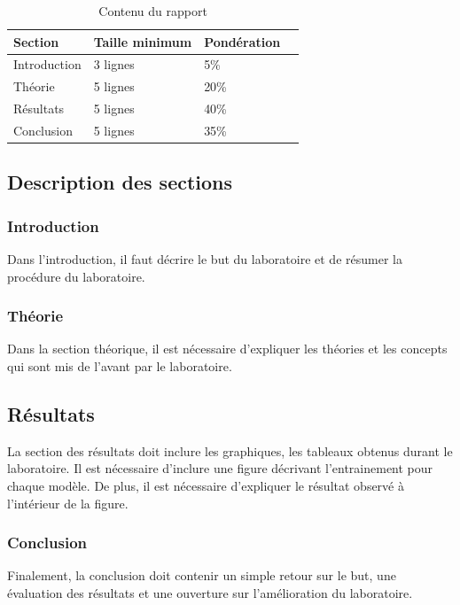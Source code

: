 \documentclass{article}
\begin{document}
\begin{table}[H]
  \caption{Contenu du rapport}
  \label{tab:remettre}
  \centering
  \begin{tabular}{|l|l|l|c|}
    \hline
    Section & Taille minimum & Pondération \\
    \hline
    Introduction & 3 lignes & 5\%\\
    Théorie & 5 lignes & 20\%\\
    Résultats & 5 lignes & 40\%\\
    Conclusion & 5 lignes & 35\%\\
    \hline
  \end{tabular}
\end{table}

\subsection{Description des sections}
\subsubsection{Introduction}
Dans l'introduction, il faut décrire le but du laboratoire et de résumer la procédure du laboratoire.

\subsubsection{Théorie}
Dans la section théorique, il est nécessaire d'expliquer les théories et les concepts qui sont mis de l'avant par le laboratoire.

\subsection{Résultats}
La section des résultats doit inclure les graphiques, les tableaux obtenus durant le laboratoire. Il est nécessaire d'inclure une figure décrivant l'entrainement pour chaque modèle. De plus, il est nécessaire d'expliquer le résultat observé à l'intérieur de la figure.

\subsubsection{Conclusion}
Finalement, la conclusion doit contenir un simple retour sur le but, une évaluation des résultats et une ouverture sur l'amélioration du laboratoire.



\end{document}
